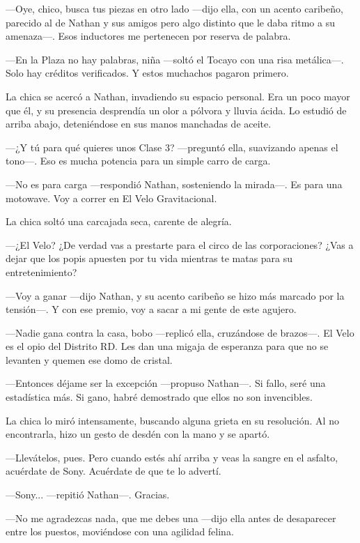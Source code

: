 \documentclass[11pt,twoside]{book}
\begin{document}
---Oye, chico, busca tus piezas en otro lado ---dijo ella, con un acento caribeño, parecido al de Nathan y sus amigos pero algo distinto que le daba ritmo a su amenaza---. Esos inductores me pertenecen por reserva de palabra.

---En la Plaza no hay palabras, niña ---soltó el Tocayo con una risa metálica---. Solo hay créditos verificados. Y estos muchachos pagaron primero.

La chica se acercó a Nathan, invadiendo su espacio personal. Era un poco mayor que él, y su presencia desprendía un olor a pólvora y lluvia ácida. Lo estudió de arriba abajo, deteniéndose en sus manos manchadas de aceite.

---¿Y tú para qué quieres unos Clase 3? ---preguntó ella, suavizando apenas el tono---. Eso es mucha potencia para un simple carro de carga.

---No es para carga ---respondió Nathan, sosteniendo la mirada---. Es para una motowave. Voy a correr en El Velo Gravitacional.

La chica soltó una carcajada seca, carente de alegría.

---¿El Velo? ¿De verdad vas a prestarte para el circo de las corporaciones? ¿Vas a dejar que los popis apuesten por tu vida mientras te matas para su entretenimiento?

---Voy a ganar ---dijo Nathan, y su acento caribeño se hizo más marcado por la tensión---. Y con ese premio, voy a sacar a mi gente de este agujero.

---Nadie gana contra la casa, bobo ---replicó ella, cruzándose de brazos---. El Velo es el opio del Distrito RD. Les dan una migaja de esperanza para que no se levanten y quemen ese domo de cristal.

---Entonces déjame ser la excepción ---propuso Nathan---. Si fallo, seré una estadística más. Si gano, habré demostrado que ellos no son invencibles.

La chica lo miró intensamente, buscando alguna grieta en su resolución. Al no encontrarla, hizo un gesto de desdén con la mano y se apartó.

---Llevátelos, pues. Pero cuando estés ahí arriba y veas la sangre en el asfalto, acuérdate de Sony. Acuérdate de que te lo advertí.

---Sony... ---repitió Nathan---. Gracias.

---No me agradezcas nada, que me debes una ---dijo ella antes de desaparecer entre los puestos, moviéndose con una agilidad felina.
\end{document}
